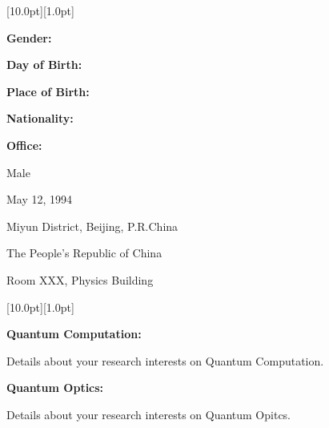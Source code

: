 \documentclass[12pt,a4paper,utf8]{report}
\begin{document}
\begin{minipage}[t]{16cm}
    \colorbox{subtitlecolor}{\raisebox{0pt}[10.0pt][1.0pt]{
        \textcolor{white}{\textsf{}}}}
\end{minipage}\par
\vspace{0.2cm}
    \begin{minipage}[t]{4cm}
        \qquad \textbf{Gender:}\par
        \qquad \textbf{Day of Birth:}\par
        \qquad \textbf{Place of Birth:}\par
        \qquad \textbf{Nationality:}\par
        \qquad \textbf{Office:}\par
    \end{minipage}
    \begin{minipage}[t]{12cm}
        Male \par
        May 12, 1994 \par
        Miyun District, Beijing, P.R.China \par
        The People's Republic of China \par
        Room XXX, Physics Building \par
    \end{minipage}\par
\vspace{0.4cm}

\begin{minipage}[t]{16cm}
    \colorbox{subtitlecolor}{\raisebox{0pt}[10.0pt][1.0pt]{
        \textcolor{white}{\textsf{}}}}
\end{minipage}\par
\vspace{0.2cm}\hspace{0.5cm}
    \begin{minipage}[t]{15.0cm}
        {\textbf{Quantum Computation:}}\par
        \quad Details about your research interests on Quantum Computation. \par
    \vspace{0.2cm}
        {\textbf{Quantum Optics:}}\par
        \quad Details about your research interests on Quantum Opitcs.
    \end{minipage}\par
\vspace{0.4cm}
\end{document}
